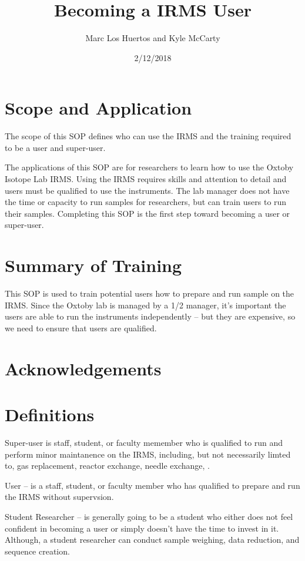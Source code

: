 \documentclass[12pt]{../SOP3_beta}\usepackage[]{graphicx}\usepackage[]{color}
\title{Becoming a IRMS User}
\date{2/12/2018}
\author{Marc Los Huertos and Kyle McCarty}
\begin{document}
\maketitle

\section{Scope and Application}

\NP The scope of this SOP defines who can use the IRMS and the training required to be a user and super-user.

\NP The applications of this SOP are for researchers to learn how to use the Oxtoby Isotope Lab IRMS. Using the IRMS requires skills and attention to detail and users must be qualified to use the instruments. The lab manager does not have the time or capacity to run samples for researchers, but can train users to run their samples. Completing this SOP is the first step toward becoming a user or super-user.

\section{Summary of Training}

\NP This SOP is used to train potential users how to prepare and run sample on the IRMS. Since the Oxtoby lab is managed by a 1/2 manager, it's important the users are able to run the instruments independently -- but they are expensive, so we need to ensure that users are qualified.

\tableofcontents

\newpage

\section{Acknowledgements}

\section{Definitions}

\NP Super-user is staff, student, or faculty memember who is qualified to run and perform minor maintanence on the IRMS, including, but not necessarily limted to, gas replacement, reactor exchange, needle exchange, .  

\NP User -- is a staff, student, or faculty member who has qualified to prepare and run the IRMS without supervsion.

\NP Student Researcher -- is generally going to be a student who either does not feel confident in becoming a user or simply doesn't have the time to invest in it. Although, a student researcher can conduct sample weighing, data reduction, and sequence creation.
\end{document}
